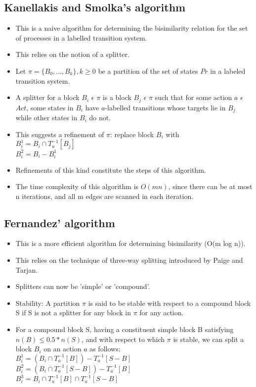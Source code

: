 \documentclass{article}
\begin{document}
\subsection{Kanellakis and Smolka's algorithm}

  \begin{itemize}
  \item This is a naive algorithm for determining the bisimilarity
    relation for the set of processes in a labelled transition system.
  \item This relies on the notion of a splitter.
  \item Let $\pi = \{ B_0, ..., B_k \}, k \ge 0$ be a partition of the
    set of states $Pr$ in a labeled transition system.
  \item A splitter for a block $B_i$ $\epsilon$ $\pi$ is a block $B_j$
    $\epsilon$ $\pi$ such that for some action $a$ $\epsilon$ $Act$, some
    states in $B_i$ have $a$-labelled transitions whose targets lie in
    $B_j$ while other states in $B_i$ do not.
  \item This suggests a refinement of $\pi$: replace block $B_i$ with
    \\
    $B_i^1 = B_i \cap T_a^{-1}[B_j] $ \\
    $B_i^2 = B_i - B_i^1 $ 
  \item Refinements of this kind constitute the steps of this
    algorithm.
  \item The time complexity of this algorithm is $O(mn)$, since there
    can be at most n iterations, and all m edges are scanned in each iteration.
  \end{itemize}

\subsection{Fernandez' algorithm}

  \begin{itemize}
  \item This is a more efficient algorithm for determining bisimilarity (O(m log n)).
  \item This relies on the technique of three-way splitting introduced
    by Paige and Tarjan.
  \item Splitters can now be 'simple' or 'compound'.
  \item Stability: A partition $\pi$ is said to be stable with respect to a
    compound block S if S is not a splitter for any block in $\pi$ for
    any action.
  \item For a compound block S, having a constituent simple block B
    satisfying $n(B) \le 0.5*n(S)$, and with respect to which $\pi$ is
    stable, we can split a block $B_i$ on an action $a$ as follows:\\
    $B_i^1 = (B_i \cap T_a^{-1}[B]) - T_a^{-1}[S-B]$ \\
    $B_i^2 = (B_i \cap T_a^{-1}[S-B]) - T_a^{-1}[B]$ \\
    $B_i^3 = B_i \cap T_a^{-1}[B] \cap T_a^{-1}[S-B]$ \\
  \end{itemize}
\end{document}
